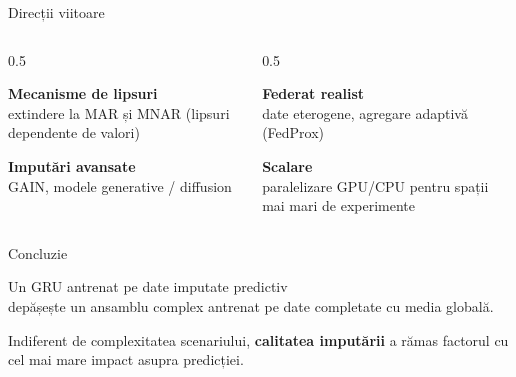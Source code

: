 \documentclass[aspectratio=169, 11pt]{beamer}
\begin{document}
\begin{frame}{Direcții viitoare}
  \begin{columns}[T]
    \begin{column}{0.5\textwidth}
      \begin{card}\small\textbf{Mecanisme de lipsuri}\\ extindere la MAR și MNAR (lipsuri dependente de valori)\end{card}
      \vspace{0.5em}
      \begin{card}\small\textbf{Imputări avansate}\\ GAIN, modele generative / diffusion\end{card}
    \end{column}
    \begin{column}{0.5\textwidth}
      \begin{card}\small\textbf{Federat realist}\\ date eterogene, agregare adaptivă (FedProx)\end{card}
      \vspace{0.5em}
      \begin{card}\small\textbf{Scalare}\\ paralelizare GPU/CPU pentru spații mai mari de experimente\end{card}
    \end{column}
  \end{columns}
\end{frame}

\begin{frame}{Concluzie}
  \vfill
  \begin{keybox}
    \centering\Large
    Un GRU antrenat pe date imputate predictiv\\ depășește un ansamblu complex antrenat pe date completate cu media globală.
  \end{keybox}
  \vfill
  \centering\normalsize\color{primary}
  Indiferent de complexitatea scenariului, \textbf{calitatea imputării} a rămas factorul cu cel mai mare impact asupra predicției.
  \vfill
\end{frame}
\end{document}
